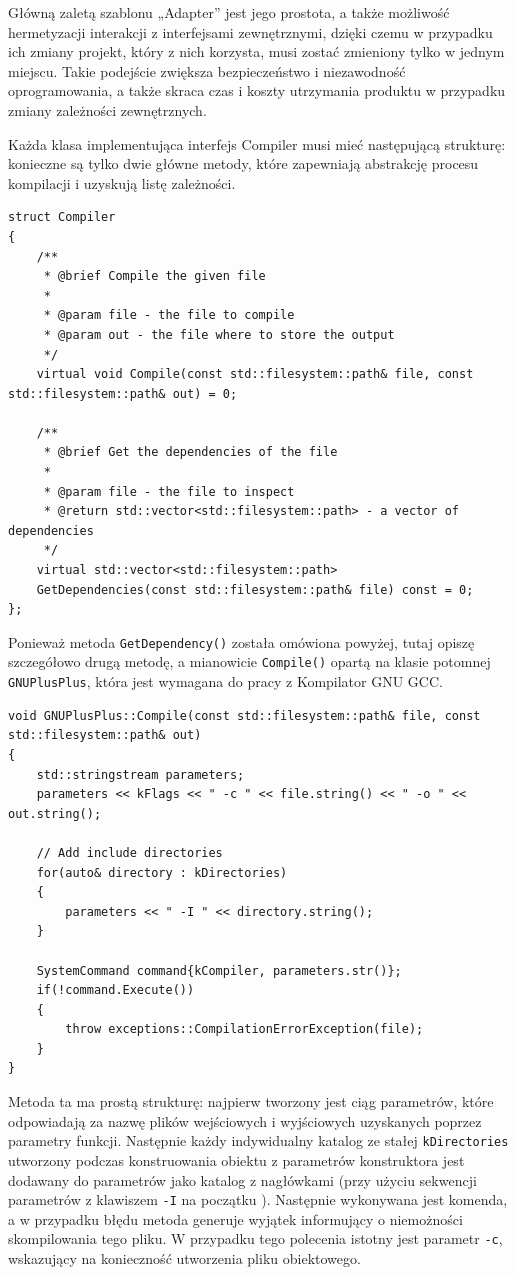 Główną zaletą szablonu „Adapter” jest jego prostota, a także możliwość hermetyzacji interakcji z interfejsami zewnętrznymi, dzięki czemu w przypadku ich zmiany projekt, który z nich korzysta, musi zostać zmieniony tylko w jednym miejscu. Takie podejście zwiększa bezpieczeństwo i niezawodność oprogramowania, a także skraca czas i koszty utrzymania produktu w przypadku zmiany zależności zewnętrznych.

Każda klasa implementująca interfejs Compiler musi mieć następującą strukturę: konieczne są tylko dwie główne metody, które zapewniają abstrakcję procesu kompilacji i uzyskują listę zależności.

\begin{lstlisting}[label=list:compiler,caption=Struktura interfejsu Compiler,basicstyle=\footnotesize\ttfamily]
struct Compiler
{
	/**
	 * @brief Compile the given file
	 * 
	 * @param file - the file to compile
	 * @param out - the file where to store the output
	 */
	virtual void Compile(const std::filesystem::path& file, const std::filesystem::path& out) = 0;

	/**
	 * @brief Get the dependencies of the file
	 * 
	 * @param file - the file to inspect
	 * @return std::vector<std::filesystem::path> - a vector of dependencies
	 */
	virtual std::vector<std::filesystem::path>
	GetDependencies(const std::filesystem::path& file) const = 0;
};
\end{lstlisting}

Ponieważ metoda \texttt{GetDependency()} została omówiona powyżej, tutaj opiszę szczegółowo drugą metodę, a mianowicie \texttt{Compile()} opartą na klasie potomnej \texttt{GNUPlusPlus}, która jest wymagana do pracy z Kompilator GNU GCC.

\begin{lstlisting}[label=list:gnu_compiler,caption=Implementacja metody GNUPlusPlus::Compile(),basicstyle=\footnotesize\ttfamily]
void GNUPlusPlus::Compile(const std::filesystem::path& file, const std::filesystem::path& out)
{
	std::stringstream parameters;
	parameters << kFlags << " -c " << file.string() << " -o " << out.string();

	// Add include directories
	for(auto& directory : kDirectories)
	{
		parameters << " -I " << directory.string();
	}

	SystemCommand command{kCompiler, parameters.str()};
	if(!command.Execute())
	{
		throw exceptions::CompilationErrorException(file);
	}
}
\end{lstlisting}

Metoda ta ma prostą strukturę: najpierw tworzony jest ciąg parametrów, które odpowiadają za nazwę plików wejściowych i wyjściowych uzyskanych poprzez parametry funkcji. Następnie każdy indywidualny katalog ze stałej \texttt{kDirectories} utworzony podczas konstruowania obiektu z parametrów konstruktora jest dodawany do parametrów jako katalog z nagłówkami (przy użyciu sekwencji parametrów z klawiszem \texttt{-I} na początku \cite{gcc}). Następnie wykonywana jest komenda, a w przypadku błędu metoda generuje wyjątek informujący o niemożności skompilowania tego pliku. W przypadku tego polecenia istotny jest parametr \texttt{-c}, wskazujący na konieczność utworzenia pliku obiektowego.

